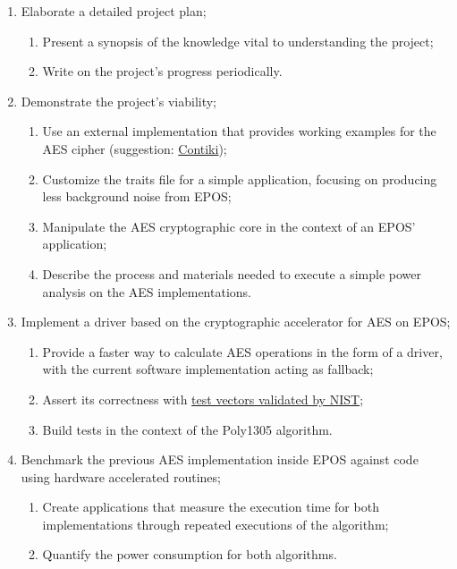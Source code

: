 \documentclass{../sftex/sftex}
\begin{document}
\begin{enumerate}
  \item Elaborate a detailed project plan;
  \begin{enumerate}
    \item Present a synopsis of the knowledge vital to understanding the
        project;
    \item Write on the project's progress periodically.
  \end{enumerate}
  \item Demonstrate the project's viability;
  \begin{enumerate}
    \item Use an external implementation that provides working examples for
        the AES cipher (suggestion:
          \href{https://github.com/contiki-os/contiki}{Contiki});
    \item Customize the traits file for a simple application, focusing on
        producing less background noise from EPOS\@;
    \item Manipulate the AES cryptographic core in the context of an EPOS'
        application;
    \item Describe the process and materials needed to execute a simple power
        analysis on the AES implementations.
  \end{enumerate}
  \item Implement a driver based on the cryptographic accelerator for AES on
      EPOS\@;
  \begin{enumerate}
    \item Provide a faster way to calculate AES operations in the form of a
        driver, with the current software implementation acting as fallback;
    \item Assert its correctness with
        \href{https://csrc.nist.gov/CSRC/media/Projects/Cryptographic-Algorithm-Validation-Program/documents/aes/AESAVS.pdf}{test
          vectors validated by NIST};
    \item Build tests in the context of the Poly1305 algorithm.
  \end{enumerate}
  \item Benchmark the previous AES implementation inside EPOS against code
      using hardware accelerated routines;
  \begin{enumerate}
    \item Create applications that measure the execution time for both
        implementations through repeated executions of the algorithm;
    \item Quantify the power consumption for both algorithms.

\end{enumerate}
\end{enumerate}
\end{document}

